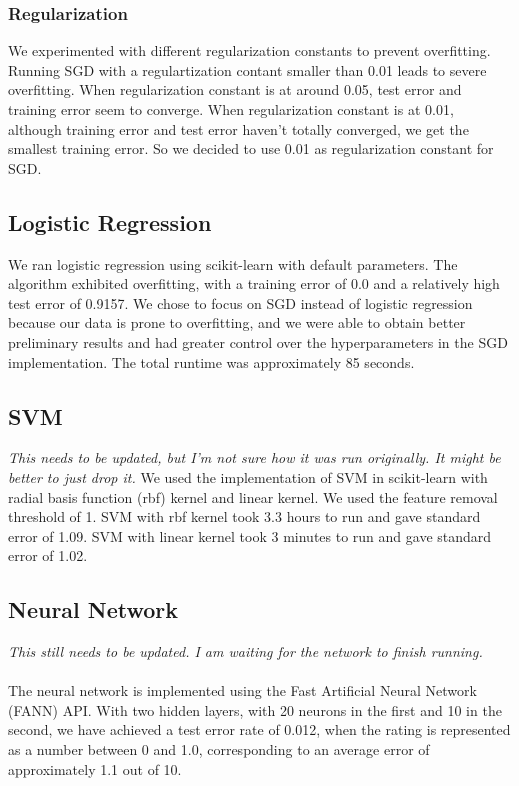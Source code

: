 \documentclass[journal]{IEEEtran}
\begin{document}
\subsubsection{Regularization}

We experimented with different regularization constants to prevent overfitting. Running SGD with a regulartization contant smaller than 0.01 leads to severe overfitting. When regularization constant is at around 0.05, test error and training error seem to converge. When regularization constant is at 0.01, although training error and test error haven't totally converged, we get the smallest training error. So we decided to use 0.01 as regularization constant for SGD.


\subsection{Logistic Regression}

We ran logistic regression using scikit-learn with default parameters.  The algorithm exhibited overfitting, with a training error of 0.0 and a relatively high test error of 0.9157.  We chose to focus on SGD instead of logistic regression because our data is prone to overfitting, and we were able to obtain better preliminary results and had greater control over the hyperparameters in the SGD implementation.  The total runtime was approximately 85 seconds.

\subsection{SVM}
\textit{This needs to be updated, but I'm not sure how it was run originally.  It might be better to just drop it.}
We used the implementation of SVM in scikit-learn with radial basis function (rbf) kernel and linear kernel. We used the feature removal threshold of 1. SVM with rbf kernel took 3.3 hours to run and gave standard error of 1.09. SVM with linear kernel took 3 minutes to run and gave standard error of 1.02.

\subsection{Neural Network}
\textit{This still needs to be updated.  I am waiting for the network to finish running.} \\ \\
The neural network is implemented using the Fast Artificial Neural Network (FANN)
API.  With two hidden layers, with 20 neurons in the first and 10 in the second,
we have achieved a test error rate of 0.012, when the rating is represented as a
number between 0 and 1.0, corresponding to an average error of approximately 1.1 out of 10.  \\
\\
\end{document}
